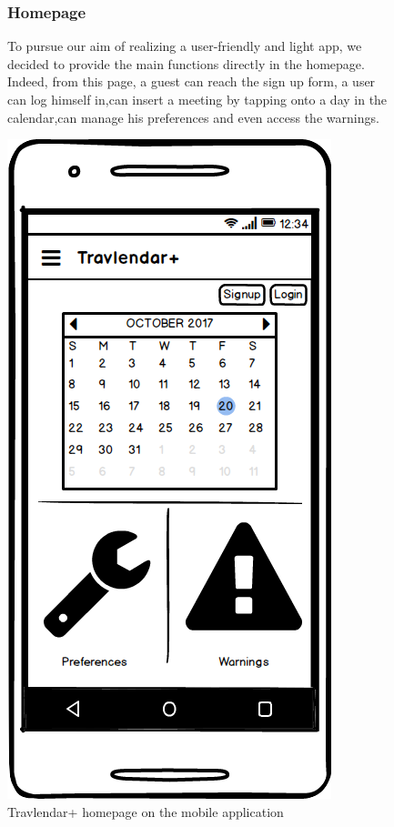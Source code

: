	\begin{figure}
			\begin{flushleft}
			\subsubsection{Homepage}
			To pursue our aim of realizing a user-friendly and light app, we decided to provide the main functions directly in the homepage. Indeed, from this page, a guest can reach the sign up form, a user can log himself in,can insert a meeting by tapping onto a day in the calendar,can manage his preferences and even access the warnings. \\ 
		\end{flushleft}
		\centering
		\includegraphics[width=0.6\linewidth]{mockups/Homepage}
		\caption{Travlendar+ homepage on the mobile application
		}
	\label{fig:homepage}
	\end{figure}
	
